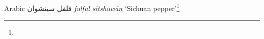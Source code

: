 \begin{etymology}\label{ety:fulful sitshuwan}
Arabic {فلفل سيتشوان} \textit{fulful sītshuwān} `Sichuan pepper'\footnote{}
\end{etymology}